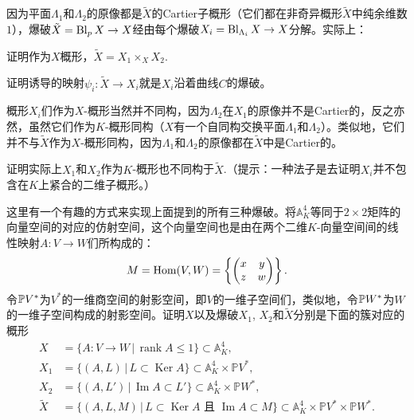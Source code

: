 因为平面$\Lambda_1$和$\Lambda_2$的原像都是$\tilde X$的Cartier子概形（它们都在非奇异概形$\tilde X$中纯余维数$1$），爆破$\tilde X=\operatorname{Bl}_pX\to X$经由每个爆破$X_i=\operatorname{Bl}_{\Lambda_i}X\to X$分解。实际上：

\begin{exe}\label{exe:4.31} 
	\begin{compactenum}[(a)]
		\item 证明作为$X$概形，$\tilde X=X_1\times_X X_2$.
		\item 证明诱导的映射$\psi_i:\tilde X\to X_i$就是$X_i$沿着曲线$C$的爆破。
	\end{compactenum}
\end{exe}

概形$X_i$们作为$X$-概形当然并不同构，因为$\Lambda_2$在$X_1$的原像并不是Cartier的，反之亦然，虽然它们作为$K$-概形同构（$X$有一个自同构交换平面$\Lambda_1$和$\Lambda_2$）。类似地，它们并不与$\tilde X$作为$X$-概形同构，因为$\Lambda_1$和$\Lambda_2$的原像都在$\tilde X$中是Cartier的。

\begin{exe}\label{exe:4.32} 
	证明实际上$X_1$和$X_2$作为$K$-概形也不同构于$\tilde X$.（提示：一种法子是去证明$X_i$并不包含在$K$上紧合的二维子概形。）
\end{exe}

\begin{exe}\label{exe:4.33} 
	这里有一个有趣的方式来实现上面提到的所有三种爆破。将$\mathbb A_K^4$等同于$2\times 2$矩阵的向量空间的对应的仿射空间，这个向量空间也是由在两个二维$K$-向量空间间的线性映射$A:V\to W$们所构成的：
	\[
	M=\operatorname{Hom}(V,W)=\left\{\begin{pmatrix}x&y\\z&w\end{pmatrix}\right\}.
	\]
	令$\mathbb{P} V^*$为$V^*$的一维商空间的射影空间，即$V$的一维子空间们，类似地，令$\mathbb{P} W^*$为$W$的一维子空间构成的射影空间。证明$X$以及爆破$X_1$, $X_2$和$\tilde X$分别是下面的簇对应的概形
	\[
	\begin{aligned}
		X&=\{A:V\to W\,|\,\operatorname{rank}A\leq 1\}\subset \mathbb A_K^4,\\
		X_1&=\{(A,L)\,|\,L\subset \operatorname{Ker}A\}\subset \mathbb A_K^4\times \mathbb PV^*,\\
		X_2&=\{(A,L')\,|\,\operatorname{Im}A\subset L'\}\subset \mathbb A_K^4\times \mathbb PW^*,\\
		\tilde X&=\{(A,L,M)\,|\, L\subset \operatorname{Ker}A\text{ 且 }\operatorname{Im}A\subset M\}\subset \mathbb A_K^4\times \mathbb PV^*\times \mathbb PW^*.
	\end{aligned}
	\]
\end{exe}

